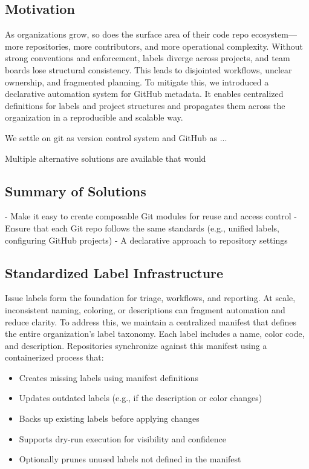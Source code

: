 \subsection{Motivation}

As organizations grow, so does the surface area of their code repo
ecosystem---more repositories, more contributors, and more operational
complexity. Without strong conventions and enforcement, labels diverge
across projects, and team boards lose structural consistency. This leads
to disjointed workflows, unclear ownership, and fragmented planning. To mitigate
this, we introduced a declarative automation system for GitHub metadata.
It enables centralized definitions for labels and project structures and
propagates them across the organization in a reproducible and scalable way.

We settle on git as version control system and GitHub as ...

Multiple alternative solutions are available that would 

\subsection{Summary of Solutions}

- Make it easy to create composable Git modules for reuse and access control
- Ensure that each Git repo follows the same standards (e.g., unified labels,
  configuring GitHub projects)
- A declarative approach to repository settings

\subsection{Standardized Label Infrastructure}

Issue labels form the foundation for triage, workflows, and reporting. At
scale, inconsistent naming, coloring, or descriptions can fragment
automation and reduce clarity. To address this, we maintain a
centralized manifest that defines the entire organization's label
taxonomy. Each label includes a name, color code, and description.
Repositories synchronize against this manifest using a containerized
process that:

\begin{itemize}
  \item Creates missing labels using manifest definitions

  \item Updates outdated labels (e.g., if the description or color
    changes)

  \item Backs up existing labels before applying changes

  \item Supports dry-run execution for visibility and confidence

  \item Optionally prunes unused labels not defined in the manifest
\end{itemize}

